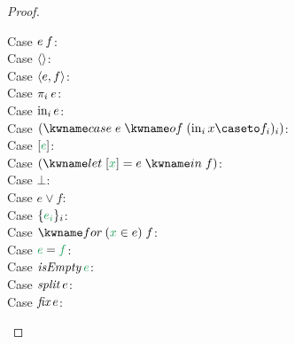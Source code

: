 \documentclass{rntz}\usepackage{fantasy}%
\begin{document}
\begin{proof}
\begin{description}
  \item[Case \(e\<f\):] \XXX
  \item[Case \(\langle{}\rangle\):] \XXX
  \item[Case \(\langle{e,f}\rangle\):] \XXX
  \item[Case \(\pi_i\<e\):] \XXX
  \item[Case \(\mathrm{in}_{i}\, e\):] \XXX
  \item[Case \((\ecase{e} (\inj i x \caseto f_i)_i)\):] \XXX
  \item[Case \(\eboxd e\):] \XXX
  \item[Case \((\elet{\eboxd x = e} f)\):] \XXX
  \item[Case \(\bot\):] \XXX
  \item[Case \(e \vee f\):] \XXX
  \item[Case \(\esetd{e_i}_i\):] \XXX
  \item[Case \(\eford x e f\):] \XXX
  \item[Case \(\eeqd e f\):] \XXX
  \item[Case \(\eisEmpty e\):] \XXX
  \item[Case \(\esplit e\):] \XXX
  \item[Case \(\efix e\):] \XXX
  \end{description}
\end{proof}
\end{document}
